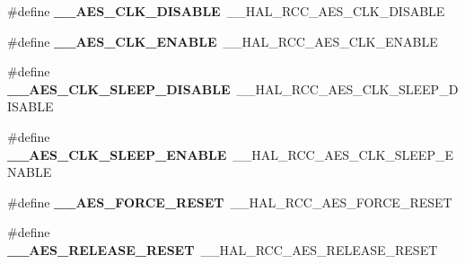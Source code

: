 \begin{DoxyCompactItemize}
\item 
\hypertarget{group___h_a_l___r_c_c___aliased_gafed074f52db05d4c07cf496232bb3153}{\#define {\bfseries \-\_\-\-\_\-\-A\-E\-S\-\_\-\-C\-L\-K\-\_\-\-D\-I\-S\-A\-B\-L\-E}~\-\_\-\-\_\-\-H\-A\-L\-\_\-\-R\-C\-C\-\_\-\-A\-E\-S\-\_\-\-C\-L\-K\-\_\-\-D\-I\-S\-A\-B\-L\-E}\label{group___h_a_l___r_c_c___aliased_gafed074f52db05d4c07cf496232bb3153}

\item 
\hypertarget{group___h_a_l___r_c_c___aliased_ga0c5aad08bba28d384dc7e1181fee6b67}{\#define {\bfseries \-\_\-\-\_\-\-A\-E\-S\-\_\-\-C\-L\-K\-\_\-\-E\-N\-A\-B\-L\-E}~\-\_\-\-\_\-\-H\-A\-L\-\_\-\-R\-C\-C\-\_\-\-A\-E\-S\-\_\-\-C\-L\-K\-\_\-\-E\-N\-A\-B\-L\-E}\label{group___h_a_l___r_c_c___aliased_ga0c5aad08bba28d384dc7e1181fee6b67}

\item 
\hypertarget{group___h_a_l___r_c_c___aliased_ga709b3ad783f3e2b16fe5f07cf5cd9ad9}{\#define {\bfseries \-\_\-\-\_\-\-A\-E\-S\-\_\-\-C\-L\-K\-\_\-\-S\-L\-E\-E\-P\-\_\-\-D\-I\-S\-A\-B\-L\-E}~\-\_\-\-\_\-\-H\-A\-L\-\_\-\-R\-C\-C\-\_\-\-A\-E\-S\-\_\-\-C\-L\-K\-\_\-\-S\-L\-E\-E\-P\-\_\-\-D\-I\-S\-A\-B\-L\-E}\label{group___h_a_l___r_c_c___aliased_ga709b3ad783f3e2b16fe5f07cf5cd9ad9}

\item 
\hypertarget{group___h_a_l___r_c_c___aliased_gab14654c7c6b702e39853f88b35228b3d}{\#define {\bfseries \-\_\-\-\_\-\-A\-E\-S\-\_\-\-C\-L\-K\-\_\-\-S\-L\-E\-E\-P\-\_\-\-E\-N\-A\-B\-L\-E}~\-\_\-\-\_\-\-H\-A\-L\-\_\-\-R\-C\-C\-\_\-\-A\-E\-S\-\_\-\-C\-L\-K\-\_\-\-S\-L\-E\-E\-P\-\_\-\-E\-N\-A\-B\-L\-E}\label{group___h_a_l___r_c_c___aliased_gab14654c7c6b702e39853f88b35228b3d}

\item 
\hypertarget{group___h_a_l___r_c_c___aliased_ga1f40700201086bcf1ec079634db1a5e4}{\#define {\bfseries \-\_\-\-\_\-\-A\-E\-S\-\_\-\-F\-O\-R\-C\-E\-\_\-\-R\-E\-S\-E\-T}~\-\_\-\-\_\-\-H\-A\-L\-\_\-\-R\-C\-C\-\_\-\-A\-E\-S\-\_\-\-F\-O\-R\-C\-E\-\_\-\-R\-E\-S\-E\-T}\label{group___h_a_l___r_c_c___aliased_ga1f40700201086bcf1ec079634db1a5e4}

\item 
\hypertarget{group___h_a_l___r_c_c___aliased_ga223935e6b265768f91c37310d4f56205}{\#define {\bfseries \-\_\-\-\_\-\-A\-E\-S\-\_\-\-R\-E\-L\-E\-A\-S\-E\-\_\-\-R\-E\-S\-E\-T}~\-\_\-\-\_\-\-H\-A\-L\-\_\-\-R\-C\-C\-\_\-\-A\-E\-S\-\_\-\-R\-E\-L\-E\-A\-S\-E\-\_\-\-R\-E\-S\-E\-T}\label{group___h_a_l___r_c_c___aliased_ga223935e6b265768f91c37310d4f56205}


\end{DoxyCompactItemize}
